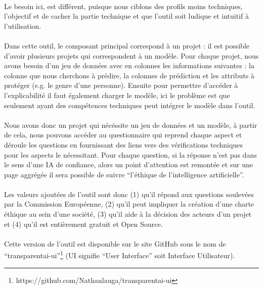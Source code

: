 \documentclass[10pt, french, a4paper]{report}
\begin{document}
\paragraph{}
Le besoin ici, est différent, puisque nous ciblons des profils moins techniques, l'objectif et de cacher la partie technique et que l'outil soit ludique et intuitif à l'utilisation. 

\paragraph{}
Dans cette outil, le composant principal correspond à un projet : il est possible d'avoir plusieurs projets qui correspondent à un modèle. Pour chaque projet, nous avons besoin d'un jeu de données avec en colonnes les informations suivantes : la colonne que nous cherchons à prédire, la colonnes de prédiction et les attributs à protéger (e.g. le genre d'une personne). Ensuite pour permettre d'accéder à l'explicabilité il faut également charger le modèle, ici le problème est que seulement ayant des compétences techniques peut intégrer le modèle dans l'outil.

\paragraph{}
Nous avons donc un projet qui nécéssite un jeu de données et un modèle, à partir de cela, nous pouvons accéder au questionnaire qui reprend chaque aspect et déroule les questions en fournissant des liens vers des vérifications techniques pour les aspects le nécessitant. Pour chaque question, si la réponse n'est pas dans le sens d'une IA de confiance, alors un point d'attention est remontée et sur une page aggrégée il sera possible de suivre ``l'éthique de l'intelligence artificielle''.

\paragraph{}
Les valeurs ajoutées de l'outil sont donc (1) qu'il répond aux questions soulevées par la Commission Européenne, (2) qu'il peut impliquer la création d'une charte éthique au sein d'une société, (3) qu'il aide à la décision des acteurs d'un projet et (4) qu'il est entièrement gratuit et Open Source.


\paragraph{}
Cette version de l'outil est disponible sur le site GitHub sous le nom de ``transparentai-ui''\footnote{https://github.com/Nathanlauga/transparentai-ui} (UI signifie ``User Interface'' soit Interface Utilisateur).
\end{document}
